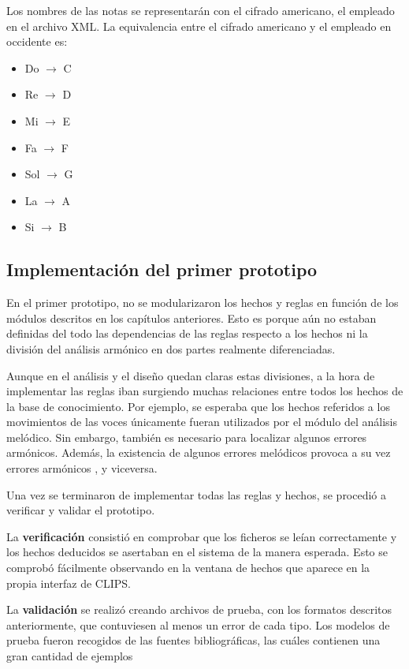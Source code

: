 Los nombres de las notas se representarán con el cifrado americano, el empleado en el archivo XML. La equivalencia entre el cifrado americano y el empleado en occidente es:

\begin{itemize}

	\item Do $\rightarrow$ C
	\item Re $\rightarrow$ D
	\item Mi $\rightarrow$ E
	\item Fa $\rightarrow$ F
	\item Sol $\rightarrow$ G
	\item La $\rightarrow$ A
	\item Si $\rightarrow$ B

\end{itemize}

\subsection{Implementación del primer prototipo}

En el primer prototipo, no se modularizaron los hechos y reglas en función de los módulos descritos en los capítulos anteriores. Esto es porque aún no estaban definidas del todo las dependencias de las reglas respecto a los hechos ni la división del análisis armónico en dos partes realmente diferenciadas. 

Aunque en el análisis y el diseño quedan claras estas divisiones, a la hora de implementar las reglas iban surgiendo muchas relaciones entre todos los hechos de la base de conocimiento. Por ejemplo, se esperaba que los hechos referidos a los movimientos de las voces únicamente fueran utilizados por el módulo del análisis melódico. Sin embargo, también es necesario para localizar algunos errores armónicos. Además, la existencia de algunos errores melódicos provoca a su vez errores armónicos , y viceversa. 

Una vez se terminaron de implementar todas las reglas y hechos, se procedió a verificar y validar el prototipo. 

La  \textbf{verificación} consistió en comprobar que los ficheros se leían correctamente y los hechos deducidos se asertaban en el sistema de la manera esperada. Esto se comprobó fácilmente observando en la ventana de hechos que aparece en la propia interfaz de CLIPS.

La \textbf{validación} se realizó creando archivos de prueba, con los formatos descritos anteriormente, que contuviesen al menos un error de cada tipo. Los modelos de prueba fueron recogidos de las fuentes bibliográficas, las cuáles contienen una gran cantidad de ejemplos


